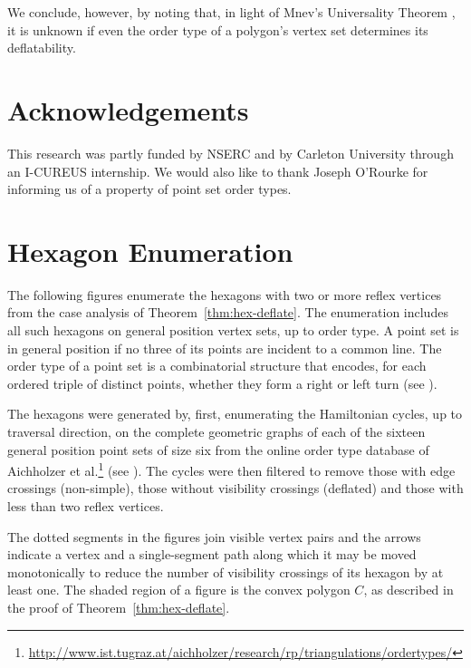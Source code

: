 \documentclass{amsart}
\begin{document}
We conclude, however, by noting that, in light of Mnev's Universality
Theorem \cite{Mnev88}, it is unknown if even the order type of a
polygon's vertex set determines its deflatability.

\section{Acknowledgements}

This research was partly funded by NSERC and by Carleton University
through an I-CUREUS internship.  We would also like to thank Joseph
O'Rourke for informing us of a property of point set order types.

{ \small

{}
}

\iffullversion

\appendix
\section{Hexagon Enumeration}
\label{apx:hexagons}
The following figures enumerate the hexagons with two or more reflex
vertices from the case analysis of Theorem~\ref{thm:hex-deflate}.  The
enumeration includes all such hexagons on general position vertex
sets, up to order type.  A point set is in general position if no
three of its points are incident to a common line.  The order type of
a point set is a combinatorial structure that encodes, for each
ordered triple of distinct points, whether they form a right or left
turn (see \cite{Goodman83}).

The hexagons were generated by, first, enumerating the Hamiltonian
cycles, up to traversal direction, on the complete geometric graphs of
each of the sixteen general position point sets of size six from the
online order type database of Aichholzer et
al.\footnote{\url{http://www.ist.tugraz.at/aichholzer/research/rp/triangulations/ordertypes/}}
(see \cite{Aichholzer02}).  The cycles were then filtered to remove
those with edge crossings (non-simple), those without visibility
crossings (deflated) and those with less than two reflex vertices.

The dotted segments in the figures join visible vertex pairs and the
arrows indicate a vertex and a single-segment path along which it may
be moved monotonically to reduce the number of visibility crossings of
its hexagon by at least one.  The shaded region of a figure is the
convex polygon $C$, as described in the proof of
Theorem~\ref{thm:hex-deflate}.


\fi
\end{document}
